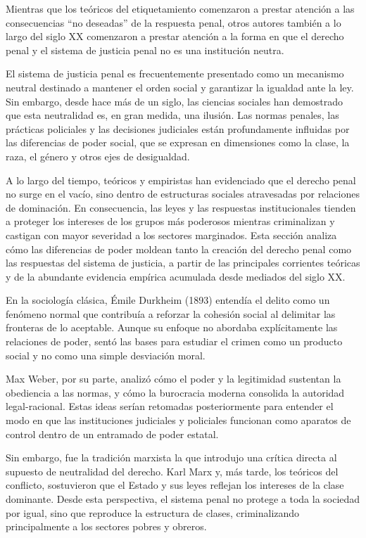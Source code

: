 \documentclass[
  spanish,
  letterpaper,
  DIV=11,
  numbers=noendperiod]{scrreprt}
\begin{document}
Mientras que los teóricos del etiquetamiento comenzaron a prestar
atención a las consecuencias ``no deseadas'' de la respuesta penal,
otros autores también a lo largo del siglo XX comenzaron a prestar
atención a la forma en que el derecho penal y el sistema de justicia
penal no es una institución neutra.

El sistema de justicia penal es frecuentemente presentado como un
mecanismo neutral destinado a mantener el orden social y garantizar la
igualdad ante la ley. Sin embargo, desde hace más de un siglo, las
ciencias sociales han demostrado que esta neutralidad es, en gran
medida, una ilusión. Las normas penales, las prácticas policiales y las
decisiones judiciales están profundamente influidas por las diferencias
de poder social, que se expresan en dimensiones como la clase, la raza,
el género y otros ejes de desigualdad.

A lo largo del tiempo, teóricos y empiristas han evidenciado que el
derecho penal no surge en el vacío, sino dentro de estructuras sociales
atravesadas por relaciones de dominación. En consecuencia, las leyes y
las respuestas institucionales tienden a proteger los intereses de los
grupos más poderosos mientras criminalizan y castigan con mayor
severidad a los sectores marginados. Esta sección analiza cómo las
diferencias de poder moldean tanto la creación del derecho penal como
las respuestas del sistema de justicia, a partir de las principales
corrientes teóricas y de la abundante evidencia empírica acumulada desde
mediados del siglo XX.

En la sociología clásica, Émile Durkheim (1893) entendía el delito como
un fenómeno normal que contribuía a reforzar la cohesión social al
delimitar las fronteras de lo aceptable. Aunque su enfoque no abordaba
explícitamente las relaciones de poder, sentó las bases para estudiar el
crimen como un producto social y no como una simple desviación moral.

Max Weber, por su parte, analizó cómo el poder y la legitimidad
sustentan la obediencia a las normas, y cómo la burocracia moderna
consolida la autoridad legal-racional. Estas ideas serían retomadas
posteriormente para entender el modo en que las instituciones judiciales
y policiales funcionan como aparatos de control dentro de un entramado
de poder estatal.

Sin embargo, fue la tradición marxista la que introdujo una crítica
directa al supuesto de neutralidad del derecho. Karl Marx y, más tarde,
los teóricos del conflicto, sostuvieron que el Estado y sus leyes
reflejan los intereses de la clase dominante. Desde esta perspectiva, el
sistema penal no protege a toda la sociedad por igual, sino que
reproduce la estructura de clases, criminalizando principalmente a los
sectores pobres y obreros.
\end{document}
